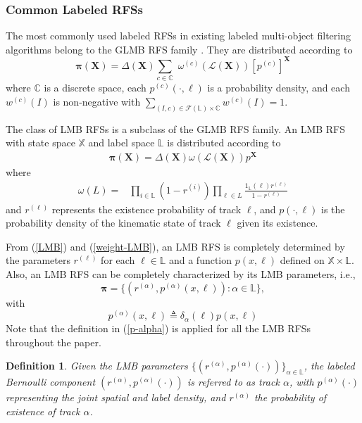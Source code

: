 \documentclass[journal]{IEEEtran}
\newcommand{\bX}{{\mathbf X}}
\newcommand{\bpi}{{\boldsymbol\pi}}
\newtheorem{Def}{Definition}
\begin{document}
\subsubsection{Common Labeled RFSs}
The most commonly used labeled RFSs in  existing labeled multi-object filtering algorithms belong to  the GLMB RFS family \cite{refr:label_1}  \cite{refr:label_2}. 
They are distributed according to 
\begin{equation}\label{GLMB}
\bpi(\bX)=\Delta(\bX){\sum}_{c\in\mathbb{C}}\,\,\omega^{(c)}(\mathcal{L}(\bX)){[p^{(c)}]}^\bX
\end{equation}
where $\mathbb{C}$ is a discrete space, each $p^{(c)}(\cdot,\ell)$ is a probability density, and each $w^{(c)}(I)$ is non-negative with $\sum_{(I,c)\in\mathcal{F}(\mathbb{L})\times\mathbb{C}} w^{(c)}(I)=1$.

The class of LMB RFSs is a  subclass of the GLMB RFS family. An  LMB RFS with state space $\mathbb{X}$ and label space $\mathbb{L}$ 
is distributed according to \cite{refr:label_1,refr:label_2,refr:label_5}
\begin{equation}\label{LMB}
\begin{split}
\bpi(\mathbf{X})=\Delta(\bX)\omega(\mathcal{L}(\bX))p^\bX
\end{split}
\end{equation}
where
\begin{align}\label{weight-LMB}
\omega(L)=&{\prod}_{i\in\mathbb{L}}(1-r^{(i)}){\prod}_{\ell\in L }\frac{1_{\mathbb{L}}(\ell)r^{(\ell)}}{1-r^{(\ell)}}
\end{align}
and $r^{(\ell)}$ represents the existence probability of track $\ell$, and 
$p(\cdot,\ell)$
 is the probability density of the kinematic state of track $\ell$ given its existence. 

From  (\ref{LMB}) and (\ref{weight-LMB}), an LMB RFS is completely determined by the parameters $r^{(\ell)}$ for each $\ell\in\mathbb{L}$ and a function $p(x,\ell)$ defined on $\mathbb{X}\times\mathbb{L}$. 
Also, an LMB RFS can be completely characterized by its
LMB
parameters, i.e.,
\begin{equation}\label{LMB-parameter}
\bpi=\{(r^{(\alpha)},p^{(\alpha)}(x,\ell)):\alpha\in\mathbb{L}\},\end{equation}
with 
\begin{equation}\label{p-alpha}
p^{(\alpha)}(x,\ell)\triangleq \delta_{\alpha}(\ell)p(x,\ell)
\end{equation}
Note that the definition in (\ref{p-alpha}) is applied for all the LMB RFSs throughout the paper.
\begin{Def}\label{definition:2}
Given the 
LMB
parameters $\{(r^{(\alpha)},p^{(\alpha
)}(\cdot))\}_{\alpha\in\mathbb{L}}$, the labeled Bernoulli component $(r^{(\alpha)},p^{(\alpha)}(\cdot))$ is referred to as  track $\alpha$, with $p^{(\alpha)}(\cdot)$ representing the joint spatial and label density, and   $r^{(\alpha)}$ the probability of existence of  track $\alpha$.
\end{Def}
\end{document}
